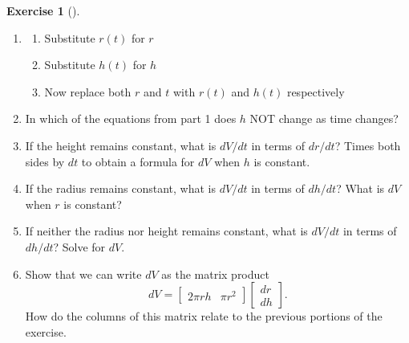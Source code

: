 \documentclass[10pt,]{book}
\theoremstyle{plain}
\theoremstyle{definition}
\theoremstyle{definition}
\theoremstyle{definition}
\theoremstyle{definition}
\newtheorem{exploration}[project]{Exercise}
\theoremstyle{definition}
\numberwithin{equation}{section}
\newcommand{\amp}{&}
\begin{document}
\begin{exploration}[]\label{prob_differential_volume_of_a_cylinder}
\leavevmode%
\begin{enumerate}[font=\bfseries,label=(\alph*),ref=\alph*]
\item\label{task-263} \begin{enumerate}[font=\bfseries,label=(\roman*),ref=\theenumi.\roman*]
\item\label{task-264} Substitute \(r(t)\) for \(r\)%
\item\label{task-265} Substitute \(h(t)\) for \(h\)%
\item\label{task-266} Now replace both \(r\) and \(t\) with \(r(t)\) and \(h(t)\) respectively%
\end{enumerate}
\item\label{task-267} In which of the equations from part 1 does \(h\) NOT change as time changes?%
\item\label{task-268} If the height remains constant, what is \(dV/dt\) in terms of \(dr/dt\)? Times both sides by \(dt\) to obtain a formula for \(dV\) when \(h\) is constant.%
\item\label{task-269} If the radius remains constant, what is \(dV/dt\) in terms of \(dh/dt\)? What is \(dV\) when \(r\) is constant?%
\item\label{task-270} If neither the radius nor height remains constant, what is \(dV/dt\) in terms of \(dh/dt\)? Solve for \(dV\).%
\item\label{task-271} Show that we can write \(dV\) as the matrix product%
\begin{equation*}
dV = \begin{bmatrix}2\pi rh\amp  \pi r^2
\end{bmatrix} \begin{bmatrix}dr\\dh
\end{bmatrix} .
\end{equation*}
How do the columns of this matrix relate to the previous portions of the exercise.%
\end{enumerate}
\end{exploration}
\end{document}
